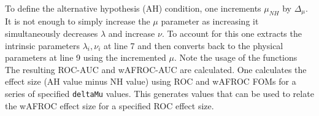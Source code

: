 \documentclass[
]{book}
\newenvironment{Shaded}{\begin{snugshade}}{\end{snugshade}}
\newcommand{\AttributeTok}[1]{\textcolor[rgb]{0.77,0.63,0.00}{#1}}
\newcommand{\CommentTok}[1]{\textcolor[rgb]{0.56,0.35,0.01}{\textit{#1}}}
\newcommand{\ControlFlowTok}[1]{\textcolor[rgb]{0.13,0.29,0.53}{\textbf{#1}}}
\newcommand{\DecValTok}[1]{\textcolor[rgb]{0.00,0.00,0.81}{#1}}
\newcommand{\FloatTok}[1]{\textcolor[rgb]{0.00,0.00,0.81}{#1}}
\newcommand{\FunctionTok}[1]{\textcolor[rgb]{0.00,0.00,0.00}{#1}}
\newcommand{\NormalTok}[1]{#1}
\newcommand{\OtherTok}[1]{\textcolor[rgb]{0.56,0.35,0.01}{#1}}
\newcommand{\SpecialCharTok}[1]{\textcolor[rgb]{0.00,0.00,0.00}{#1}}
\begin{document}
To define the alternative hypothesis (AH) condition, one increments \(\mu_{NH}\) by \(\Delta_{\mu}\). It is not enough to simply increase the \(\mu\) parameter as increasing it simultaneously decreases \(\lambda\) and increase \(\nu\). To account for this one extracts the intrinsic parameters \(\lambda_i, \nu_i\) at line 7 and then converts back to the physical parameters at line 9 using the incremented \(\mu\). Note the usage of the functions The resulting ROC-AUC and wAFROC-AUC are calculated. One calculates the effect size (AH value minus NH value) using ROC and wAFROC FOMs for a series of specified \texttt{deltaMu} values. This generates values that can be used to relate the wAFROC effect size for a specified ROC effect size.

\begin{Shaded}
\end{Shaded}
\end{document}
